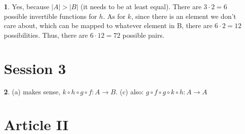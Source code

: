 \documentclass{article}
\theoremstyle{definition}
\newcommand{\abs}[1]{\left|#1\right|}
\theoremstyle{definition}
\theoremstyle{definition}
\newtheorem{solution-internal}{}[subsection]
\newenvironment{solution}{
  \begin{solution-internal}
}{
  \end{solution-internal}
}
\begin{document}
\begin{solution}

Yes, because $\abs{A} > \abs{B}$ (it needs to be at least equal). There are
$3\cdot 2 = 6$ possible invertible functions for $h$. As for $k$, since there is
an element we don't care about, which can be mapped to whatever element in B,
there are $6 \cdot 2 = 12$ possibilities. Thus, there are $6 \cdot 12 = 72$ possible pairs.

\end{solution}

\section*{Session 3}
\setcounter{subsection}{3}
\renewcommand{\thesection}{\arabic{section}} 
\renewcommand{\thesubsection}{\arabic{subsection}}
\setcounter{solution-internal}{0}

\begin{solution}
(a) makes sense, $k\circ h \circ g \circ f \colon A \to B$. (c) also: $g\circ f \circ g \circ k \circ h \colon A \to A$
\end{solution}


\section*{Article II}
\setcounter{subsection}{2}
\renewcommand{\thesubsection}{\Roman{subsection}}
\setcounter{solution-internal}{0}
\end{document}
